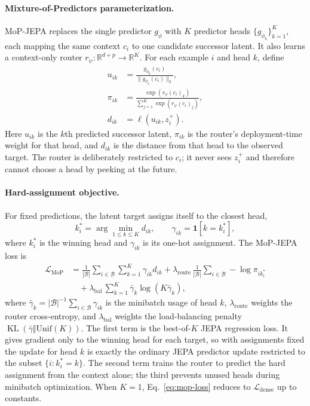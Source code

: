 \documentclass[letterpaper]{article}
\begin{document}
\paragraph{Mixture-of-Predictors parameterization.}
MoP-JEPA replaces the single predictor $g_\phi$ with $K$ predictor heads
$\{g_{\phi_k}\}_{k=1}^K$, each mapping the same context $c_i$ to one candidate successor latent. It also
learns a context-only router $r_\psi:\mathbb{R}^{d+p}\to\mathbb{R}^K$. For each example $i$ and head $k$,
define
\begin{equation}
\begin{aligned}
u_{ik} &= \frac{g_{\phi_k}(c_i)}{\lVert g_{\phi_k}(c_i)\rVert_2},\\
\pi_{ik} &= \frac{\exp(r_\psi(c_i)_k)}
{\sum_{j=1}^K \exp(r_\psi(c_i)_j)},\\
d_{ik} &= \ell(u_{ik},z_i^+).
\end{aligned}
\end{equation}
Here $u_{ik}$ is the $k$th predicted successor latent, $\pi_{ik}$ is the router's deployment-time weight for
that head, and $d_{ik}$ is the distance from that head to the observed target. The router is deliberately
restricted to $c_i$; it never sees $z_i^+$ and therefore cannot choose a head by peeking at the future.

\paragraph{Hard-assignment objective.}
For fixed predictions, the latent target assigns itself to the closest head,
\begin{equation}
k_i^*=\arg\min_{1\leq k\leq K} d_{ik},\qquad
\gamma_{ik}=\mathbf{1}[k=k_i^*],
\end{equation}
where $k_i^*$ is the winning head and $\gamma_{ik}$ is its one-hot assignment. The MoP-JEPA loss is
\begin{equation}
\begin{aligned}
\mathcal{L}_{\mathrm{MoP}}
&= \frac{1}{|\mathcal{B}|}\sum_{i\in\mathcal{B}}\sum_{k=1}^K
\gamma_{ik} d_{ik}
+ \lambda_{\mathrm{route}}\,
\frac{1}{|\mathcal{B}|}\sum_{i\in\mathcal{B}} -\log \pi_{i k_i^*}\\
&\quad + \lambda_{\mathrm{bal}}\,
\sum_{k=1}^K \bar\gamma_k \log (K\bar\gamma_k),
\end{aligned}
\label{eq:mop-loss}
\end{equation}
where $\bar\gamma_k=|\mathcal{B}|^{-1}\sum_{i\in\mathcal{B}}\gamma_{ik}$ is the minibatch usage of head
$k$, $\lambda_{\mathrm{route}}$ weights the router cross-entropy, and $\lambda_{\mathrm{bal}}$ weights the
load-balancing penalty $\operatorname{KL}(\bar\gamma\Vert\mathrm{Unif}(K))$. The first term is the
best-of-$K$ JEPA regression loss. It gives gradient only to the winning head for each target, so with
assignments fixed the update for head $k$ is exactly the ordinary JEPA predictor update restricted to the
subset $\{i:k_i^*=k\}$. The second term trains the router to predict the hard assignment from the context
alone; the third prevents unused heads during minibatch optimization. When $K=1$, Eq.~\eqref{eq:mop-loss}
reduces to $\mathcal{L}_{\mathrm{dense}}$ up to constants.
\end{document}
